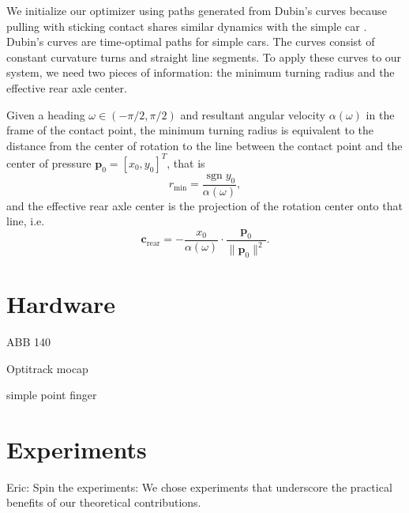 \documentclass[conference]{IEEEtran}
\DeclareMathOperator{\sign}{\text{sgn}}
\newcommand{\EH}[1]{{\color{blue} {Eric: {#1}}  }}
\begin{document}
We initialize our optimizer using paths generated from Dubin's curves
\cite{dubins1957curves} because pulling with sticking contact shares
similar dynamics with the simple car \cite{lavalle1999planning}.
Dubin's curves are time-optimal paths for simple cars. The curves
consist of constant curvature turns and straight line segments. To
apply these curves to our system, we need two pieces of information:
the minimum turning radius and the effective rear axle center. 

Given a heading $\omega \in (-\pi/2,\pi/2) $ and resultant angular velocity
$\alpha(\omega)$ in the frame of the contact point, the minimum
turning radius is equivalent to the distance from the center of
rotation to the line between the contact point and the center of
pressure $\mathbf{p}_0 = [x_0,y_0]^T$, that is
\begin{equation}
  r_{\text{min}} = \frac{\sign y_0}{\alpha(\omega)},
\end{equation}
and the effective rear axle center is the projection of the rotation center onto that line, i.e.
\begin{equation}
  \mathbf{c}_{\text{rear}} = -\frac{x_0}{\alpha(\omega)}\cdot\frac{\mathbf{p}_0}{\lVert \mathbf{p}_0 \rVert^2}.
\end{equation}

\section{Hardware}

\begin{inparaenum}
\item ABB 140
\item Optitrack mocap
\item simple point finger
\end{inparaenum}

\section{Experiments}\label{sec:experiments}
\EH{Spin the experiments: We chose experiments that underscore the
  practical benefits of our theoretical contributions.}
\end{document}
